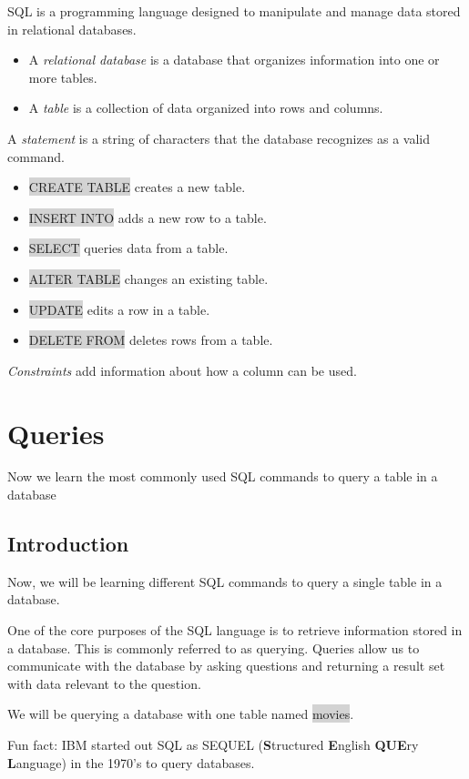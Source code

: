 \documentclass[11pt]{article}
\begin{document}
SQL is a programming language designed to manipulate and manage data stored in relational databases.
\begin{itemize}
\item A \textit{relational database} is a database that organizes information into one or more tables.
\item A \textit{table} is a collection of data organized into rows and columns.
\end{itemize}
A \textit{statement} is a string of characters that the database recognizes as a valid command.
\begin{itemize}
\item \colorbox{lightgray}{CREATE TABLE} creates a new table.
\item \colorbox{lightgray}{INSERT INTO} adds a new row to a table.
\item \colorbox{lightgray}{SELECT} queries data from a table.
\item \colorbox{lightgray}{ALTER TABLE} changes an existing table.
\item \colorbox{lightgray}{UPDATE} edits a row in a table.
\item \colorbox{lightgray}{DELETE FROM} deletes rows from a table.
\end{itemize}
\textit{Constraints} add information about how a column can be used.

\newpage
\section{Queries}
Now we learn the most commonly used SQL commands to query a table in a database
\subsection{Introduction}
Now, we will be learning different SQL commands to query a single table in a database.

One of the core purposes of the SQL language is to retrieve information stored in a database. This is commonly referred to as querying. Queries allow us to communicate with the database by asking questions and returning a result set with data relevant to the question.

We will be querying a database with one table named \colorbox{lightgray}{movies}.

Fun fact: IBM started out SQL as SEQUEL (\textbf{S}tructured \textbf{E}nglish \textbf{QUE}ry \textbf{L}anguage) in the 1970’s to query databases.
\end{document}
